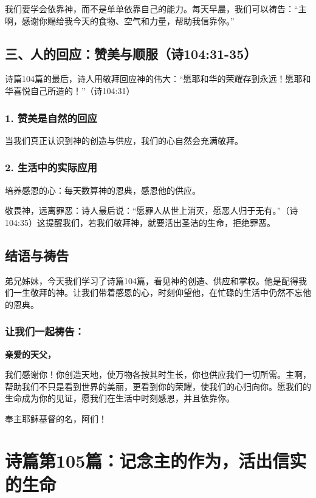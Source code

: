 \documentclass[a4paper, 12pt]{article}
\begin{document}
我们要学会依靠神，而不是单单依靠自己的能力。每天早晨，我们可以祷告：“主啊，感谢你赐给我今天的食物、空气和力量，帮助我信靠你。”

\subsection*{三、人的回应：赞美与顺服（诗104:31-35）}
诗篇104篇的最后，诗人用敬拜回应神的伟大：“愿耶和华的荣耀存到永远！愿耶和华喜悦自己所造的！”（诗104:31）

\subsubsection*{1. 赞美是自然的回应}
当我们真正认识到神的创造与供应，我们的心自然会充满敬拜。

\subsubsection*{2. 生活中的实际应用}

\hspace{0.6cm}培养感恩的心：每天数算神的恩典，感恩他的供应。

敬畏神，远离罪恶：诗人最后说：“愿罪人从世上消灭，愿恶人归于无有。”（诗104:35）这提醒我们，若我们敬拜神，就要活出圣洁的生命，拒绝罪恶。

\subsection*{结语与祷告}
\hspace{0.6cm}弟兄姊妹，今天我们学习了诗篇104篇，看见神的创造、供应和掌权。他是配得我们一生敬拜的神。让我们带着感恩的心，时刻仰望他，在忙碌的生活中仍然不忘他的恩典。

\subsubsection*{让我们一起祷告：}

\textbf{亲爱的天父，}

我们感谢你！你创造天地，使万物各按其时生长，你也供应我们一切所需。主啊，帮助我们不只是看到世界的美丽，更看到你的荣耀，使我们的心归向你。愿我们的生命成为你的见证，愿我们在生活中时刻感恩，并且依靠你。

奉主耶稣基督的名，阿们！
\newpage
\section{诗篇第105篇：记念主的作为，活出信实的生命}
\end{document}
